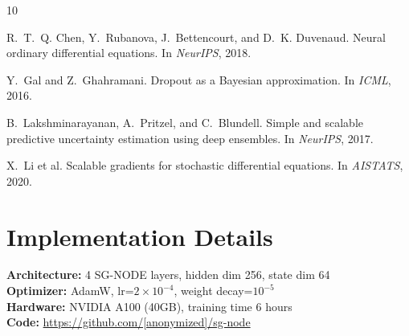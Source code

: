 \documentclass{article}
\begin{document}

\begin{thebibliography}{10}

R.~T.~Q. Chen, Y.~Rubanova, J.~Bettencourt, and D.~K. Duvenaud.
\newblock Neural ordinary differential equations.
\newblock In \emph{NeurIPS}, 2018.

Y.~Gal and Z.~Ghahramani.
\newblock Dropout as a Bayesian approximation.
\newblock In \emph{ICML}, 2016.

B.~Lakshminarayanan, A.~Pritzel, and C.~Blundell.
\newblock Simple and scalable predictive uncertainty estimation using deep ensembles.
\newblock In \emph{NeurIPS}, 2017.

X.~Li et al.
\newblock Scalable gradients for stochastic differential equations.
\newblock In \emph{AISTATS}, 2020.

\end{thebibliography}

\appendix

\section{Implementation Details}

\textbf{Architecture:} 4 SG-NODE layers, hidden dim 256, state dim 64 \\
\textbf{Optimizer:} AdamW, lr=$2 \times 10^{-4}$, weight decay=$10^{-5}$ \\
\textbf{Hardware:} NVIDIA A100 (40GB), training time 6 hours \\
\textbf{Code:} \url{https://github.com/[anonymized]/sg-node}
\end{document}
